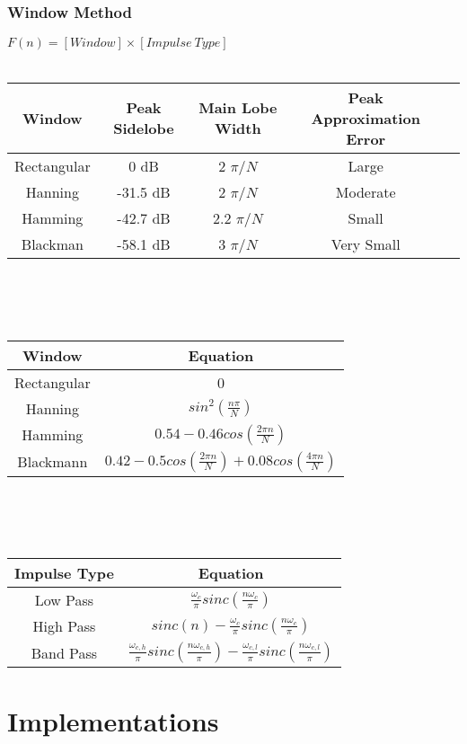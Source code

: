 \documentclass[11pt, oneside]{article}
\begin{document}
\subsubsection{Window Method}
$F(n) = [Window]\times [Impulse\ Type]$\\\\
\begin{tabular}{|c|c|c|c|c|}\hline
\bf{Window} & \bf{Peak Sidelobe} & \bf{Main Lobe Width} & \bf{Peak Approximation Error} \\\hline
Rectangular & 0 dB & 2 $\pi / N$ & Large \\\hline
Hanning & -31.5 dB & 2 $\pi / N$ & Moderate \\\hline
Hamming & -42.7 dB & 2.2 $\pi / N$ & Small \\\hline
Blackman & -58.1 dB & 3 $\pi / N$ & Very Small \\\hline
\end{tabular}
\\\\\\
\begin{tabular}{|c|c|}\hline
\bf{Window} & \bf{Equation}\\\hline 
Rectangular & 0 \\\hline
Hanning & $sin^2(\frac{n\pi}{N})$ \\\hline
Hamming & $0.54 - 0.46 cos(\frac{2\pi n}{N})$ \\\hline
Blackmann & $0.42 - 0.5 cos(\frac{2\pi n}{N}) + 0.08 cos(\frac{4\pi n}{N})$ \\\hline
\end{tabular}
\\\\\\
\begin{tabular}{|c|c|}\hline
\bf{Impulse Type} & \bf{Equation}\\\hline 
Low Pass & $\frac{\omega_c}{\pi}sinc(\frac{n\omega_c}{\pi})$ \\\hline
High Pass & $sinc(n) - \frac{\omega_c}{\pi}sinc(\frac{n\omega_c}{\pi})$ \\\hline
Band Pass & $\frac{\omega_{c,h}}{\pi}sinc(\frac{n\omega_{c,h}}{\pi}) - \frac{\omega_{c,l}}{\pi}sinc(\frac{n\omega_{c,l}}{\pi})$ \\\hline
\end{tabular}

\section{Implementations}
\end{document}
